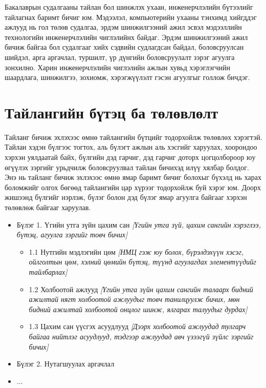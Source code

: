 Бакалаврын судалгааны тайлан бол шинжлэх ухаан, инженерчлэлийн бүтээлийг тайлагнах баримт бичиг юм. Мэдээлэл, компьютерийн ухааны тэнхимд хийгддэг ажлууд нь гол төлөв судалгаа, эрдэм шинжилгээний ажил эсвэл мэдээллийн технологийн инженерчлэлийн чиглэлийнх байдаг. Эрдэм шинжилгээний ажил бичиж байгаа бол судалгааг хийх сэдвийн судлагдсан байдал, боловсруулсан шийдэл, арга аргачлал, туршилт, үр дүнгийн боловсруулалт зэрэг агуулга зонхилно. Харин инженерчлэлийн чиглэлийн ажлын хувьд хэрэглэгчийн шаардлага, шинжилгээ, зохиомж, хэрэгжүүлэлт гэсэн агуулгыг голлож бичдэг.

\section{Тайлангийн бүтэц ба төлөвлөлт}
Тайланг бичиж эхлэхээс өмнө тайлангийн бүтцийг тодорхойлж төлөвлөх хэрэгтэй. Тайлан хэдэн бүлгээс тогтох, аль бүлэгт ажлын аль хэсгийг харуулах, хоорондоо хэрхэн уялдаатай байх, бүлгийн дэд гарчиг, дэд гарчиг доторх цогцолбороор юу өгүүлэх зэргийг урьдчилж боловсруулвал тайлан бичихэд илүү хялбар болдог. Энэ нь тайланг бичиж эхлэхээс өмнө ямар баримт бичиг болохыг бүхэлд нь харах боломжийг олгох бөгөөд тайлангийн цар хүрээг тодорхойлж буй хэрэг юм. Доорх жишээнд бүлгийг нэрлэж, бүлэг болон дэд бүлэг ямар агуулга байгааг хэрхэн төлөвлөж байгааг харуулав.

\begin{itemize}
	\item Бүлэг 1. Үгийн утга зүйн цахим сан
	\textit{[Үгийн утга зүй, цахим сангийн хэрэглээ, бүтэц, агуулга зэргийг товч бичих]}
	\begin{itemize}
	    \item 1.1 Нутгийн мэдлэгийн цөм \textit{[НМЦ гэж юу болох, бүрэлдэхүүн хэсэг, ойлголтын цөм, хэлний цөмийн бүтэц, түүнд агуулагдах элементүүдийг тайлбарлах]}
	    \item 1.2 Холбоотой ажлууд \textit{[Үгийн утга зүйн цахим сангийн талаарх бидний ажилтай нягт холбоотой ажлуудыг товч танилцуулж бичих, мөн бидний ажилтай холбоотой онцлог шинж, ялгарах талуудыг дурдах]}
	    \item 1.3 Цахим сан үүсгэх асуудлууд \textit{[Дээрх холбоотой ажлуудад тулгарч байгаа нийтлэг асуудлууд, тэдгээр ажлуудад авч үзээгүй зүйлс зэргийг бичих]}
	\end{itemize}
	\item Бүлэг 2. Нутагшуулах аргачлал
	\item ...
\end{itemize}

